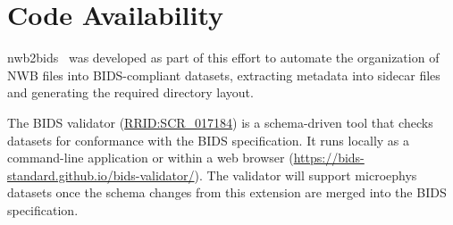 \documentclass[fleqn,10pt]{article}
\newcommand{\rrid}[1]{\href{https://scicrunch.org/resolver/#1}{#1}}
\begin{document}





\section*{Code Availability}\label{sec:code-availability}
nwb2bids~\citep{nwb2bids_zenodo} was developed as part of this effort to automate the organization of NWB files into BIDS-compliant datasets, extracting metadata into sidecar files and generating the required directory layout.

The BIDS validator (\rrid{RRID:SCR\_017184}) is a schema-driven tool that checks datasets for conformance with the BIDS specification.
It runs locally as a command-line application or within a web browser (\url{https://bids-standard.github.io/bids-validator/}).
The validator will support microephys datasets once the schema changes from this extension are merged into the BIDS specification.
\end{document}
